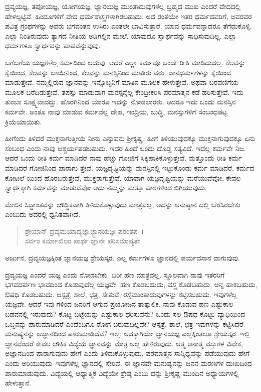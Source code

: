 ದ್ರವ್ಯಯಜ್ಞ, ತಪೋಯಜ್ಞ, ಯೋಗಯಜ್ಞ, ಜ್ಞಾನಯಜ್ಞ ಮುಂತಾದುವುಗಳೆಲ್ಲ ಬ್ರಹ್ಮದ ಮುಖ ಎಂದರೆ ವೇದದಲ್ಲಿ ಹೇಳಲ್ಪಟ್ಟಿವೆ. ಹಿಂದೂಗಳಿಗೆ ವೇದ ಧರ್ಮಶಾಸ್ತ್ರಗಳಾಗಿರಬಹುದು. ಅದ ರಂತೆಯೇ ಇತರ ಧರ್ಮದವರಿಗೆ, ಅವರವರ ಪವಿತ್ರ ಗ್ರಂಥಗಳನ್ನು ಅವರು ಭಗವಂತನ ಉಸಿರು ಎಂತಲೇ ಭಾವಿಸುತ್ತಾರೆ. ಯಾವ ಧರ್ಮವನ್ನಾದರೂ ತೆಗೆದುಕೊಳ್ಳಿ. ಎಲ್ಲಾ ನಿಂತಿರುವುದು ತ್ಯಾಗದ ನೀತಿಯ ಅಡಿಗಲ್ಲಿನ ಮೇಲೆ. ಯಾವುದೂ ಸ್ವಾರ್ಥವನ್ನು ಸಾಧಿಸುವುದಿಲ್ಲ. ಎಲ್ಲಾ ಧರ್ಮಗಳೂ ಸ್ವಾರ್ಥವನ್ನು ಪಾಪವೆನ್ನುವುವು.

ಬಗೆಬಗೆಯ ಯಜ್ಞಗಳೆಲ್ಲ ಕರ್ಮದಿಂದ ಆದುವು. ಆದರೆ ಎಲ್ಲಾ ಕರ್ಮವೂ ಒಂದೇ ರೀತಿ ಮಾಡಿದುದಲ್ಲ. ಕೆಲವನ್ನು ಕೈಯಿಂದ, ಕೆಲವನ್ನು ಬಾಯಿನಿಂದ, ಕೆಲವನ್ನು ಮನಸ್ಸಿನಿಂದ ಮಾಡಿರು ವರು. ದಾನಧರ್ಮಗಳನ್ನು ಕೈಯಿಂದ ಮಾಡುತ್ತೇವೆ. ನಮ್ಮಲ್ಲಿರುವ ಜ್ಞಾನವನ್ನು ಇನ್ನೊಬ್ಬನಿಗೆ ಮಾತಿನ ಮೂಲಕ ಹೇಳುತ್ತೇವೆ. ಅಥವಾ ಬರವಣಿಗೆಯ ಮೂಲಕ ಬರೆದಿಡುತ್ತೇವೆ. ತಪಸ್ಸು ಮಾಡುವಾಗ ಮನಸ್ಸನ್ನೆಲ್ಲ ಕೇಂದ್ರೀಕರಿಸಿ ಪರಮಾತ್ಮನ ಕಡೆ ಹರಿಸುತ್ತೇವೆ. ಇದು ತುಂಬಾ ಸೂಕ್ಷ್ಮವಾದದ್ದು. ಹೊರಗಿನಿಂದ ಯಾರೂ ಇದನ್ನು ನೋಡಲಾರರು. ಆದರೂ ಇದು ಒಂದು ಮನಸ್ಸಿನ ಕರ್ಮವೇ. ಅಂತೂ ನಾವು ಮಾಡುವ ಕರ್ಮವೆಲ್ಲ ದೇಹ, ಇಂದ್ರಿಯ, ಬುದ್ಧಿ, ಮನಸ್ಸುಗಳಿಗೆ ಸಂಬಂಧಪಟ್ಟ ಕ್ರಿಯೆಯಾಯಿತು.

ಹೀಗೆಂದು ತಿಳಿದರೆ ಮುಕ್ತನಾಗುತ್ತೀಯೆ ನೀನು ಎನ್ನುವನು ಶ‍್ರೀಕೃಷ್ಣ. ಹೀಗೆ ತಿಳಿಯುವುದಕ್ಕೂ ಮುಕ್ತನಾಗುವುದಕ್ಕೂ ಏನು ಸಂಬಂಧ ಎಂದು ನಾವು ಆಶ್ಚರ್ಯಪಡಬಹುದು. ಇದರ ಹಿಂದೆ ಒಂದು ದೊಡ್ಡ ಸತ್ಯವಿದೆ. ಇದೆಲ್ಲ ಕರ್ಮವೇ ನಿಜ. ಆದರೆ ಒಂದು ರೀತಿ ಕರ್ಮ ಮಾಡಿದರೆ ನಾವು ಹೆಚ್ಚು ಗೋಜಿಗೆ ಸಿಕ್ಕಿಹಾಕಿಕೊಳ್ಳುತ್ತೇವೆ. ಮತ್ತೊಂದು ರೀತಿ ಕರ್ಮ ಮಾಡಿದರೆ ಗೋಜಿನಿಂದ ಪಾರಾಗು ತ್ತೇವೆ. ಯಜ್ಞದೃಷ್ಟಿಯನ್ನು ಮನಸ್ಸಿನಲ್ಲಿ ಇಟ್ಟುಕೊಂಡು ಕರ್ಮ ಮಾಡಿದರೆ, ಕರ್ಮದ ಕೋಟಲೆ ಯಿಂದ ಹೊರಬರುತ್ತೇವೆ, ಮುಕ್ತರಾಗುತ್ತೇವೆ. ಯಾವಾಗ ಯಜ್ಞದೃಷ್ಟಿಯನ್ನು ಮರೆಯುವೆವೋ, ಕೇವಲ ಸ್ವಾರ್ಥಕ್ಕಾಗಿ ಕರ್ಮವನ್ನು ಮಾಡುವೆವೋ ಅದು ನಮ್ಮನ್ನು ಮತ್ತೂ ಪಾಶಗಳಿಂದ ಬಿಗಿಯುವುದು.

ಮೇಲಿನ ಸಿದ್ಧಾಂತವನ್ನು ಬೌದ್ಧಿಕವಾಗಿ ತಿಳಿದುಕೊಳ್ಳುವುದು ಮಾತ್ರವಲ್ಲ, ಅದನ್ನು ಅನುಷ್ಠಾನ ದಲ್ಲಿ ಬೆರೆಸಿರಬೇಕು ಎಂಬುದು ಅದರಲ್ಲಿ ಧ್ವನಿತವಾಗಿದೆ.

\begin{verse}
ಶ್ರೇಯಾನ್ ದ್ರವ್ಯಮಯಾದ್ಯಜ್ಞಾಜ್ಜ್ಞಾನಯಜ್ಞಃ ಪರಂತಪ~।\\ಸರ್ವಂ ಕರ್ಮಾಖಿಲಂ ಪಾರ್ಥ ಜ್ಞಾನೇ ಪರಿಸಮಾಪ್ಯತೇ 
\end{verse}

{\small ಅರ್ಜುನ, ದ್ರವ್ಯಯಜ್ಞಕ್ಕಿಂತ ಜ್ಞಾನಯಜ್ಞ ಶ್ರೇಯಸ್ಕರ. ಎಲ್ಲ ಕರ್ಮಗಳೂ ಜ್ಞಾನದಲ್ಲಿ ಪರ್ಯವಸಾನ ವಾಗುವುವು.}

ದ್ರವ್ಯಯಜ್ಞ ಎಂದರೆ  ಯಜ್ಞ ಎಂದು ನೋಡಬೇಕು. ಬರೀ ಹಣ ಮಾತ್ರವಲ್ಲ. ಸ್ಥೂಲವಾಗಿ ನಾವು ಇತರರಿಗೆ ಭಗವದರ್ಪಣ ಭಾವದಿಂದ ಕೊಡುವುದೆಲ್ಲ ಯಜ್ಞವೇ. ಹಣ ಕೊಡಬಹುದು, ವಸ್ತ್ರ ಕೊಡಬಹುದು, ಅನ್ನ ಹಾಕಬಹುದು, ಔಷಧಿ ಕೊಡಬಹುದು. ಆಸ್ಪತ್ರೆ, ಶಾಲೆ, ಛತ್ರ, ಸೇತುವೆ, ರಸ್ತೆಮುಂತಾದುವುಗಳನ್ನು ಕಟ್ಟಿಸಬಹುದು. ಇವುಗಳೆಲ್ಲ ಯಜ್ಞವೇ. ಆದರೆ ಇವು ಗಳಿಂದ ಜನರಿಗೆ ಆಗುವ ಪ್ರಯೋಜನ ತಾತ್ಕಾಲಿಕ. ನಾವು ಕೊಡುವ ಹಣ ಎಷ್ಟುಕಾಲ ಬಡವನಲ್ಲಿ ಇರುವುದು? ಕೊಟ್ಟ ಬಟ್ಟೆಯನ್ನು ಎಷ್ಟುಕಾಲ ಧರಿಸುವನು? ಒಂದು ಸಲ ಔಷಧ ಕೊಟ್ಟು ವ್ಯಾಧಿಯಿಂದ ಒಬ್ಬನನ್ನು ಪಾರುಮಾಡಿದರೆ ಎಂದೆಂದಿಗೂ ರೋಗ ಬರುವುದಿಲ್ಲವೇ? ಆಸ್ಪತ್ರೆ, ಶಾಲೆ, ಛತ್ರ ಇವುಗಳನ್ನು ಕಟ್ಟಿಸಿದರೆ ಮನುಷ್ಯನನ್ನು ಅಜ್ಞಾನದಿಂದ ಪಾರುಮಾಡಿದೆವೆ? ಇಲ್ಲ. ಅದಕ್ಕಾಗಿಯೇ ಜ್ಞಾನಯಜ್ಞ ಎಲ್ಲಕ್ಕಿಂತಲೂ ಶ್ರೇಯಸ್ಕರ. ಇಲ್ಲಿ ಜ್ಞಾನವೆಂದರೆ ಕೇವಲ ಲೌಕಿಕ ವಿದ್ಯೆಯ ಜ್ಞಾನವನ್ನು ಮಾತ್ರ ಅಲ್ಲ ಹೇಳಿರುವುದು. ಆತ್ಮ ಅನಾತ್ಮ ವಸ್ತುಗಳ ವಿವೇಕ, ಅಜ್ಞಾನದಿಂದ ಪಾರಾಗುವುದು ಹೇಗೆ ಎಂದು ತಿಳಿದುಕೊಳ್ಳುವುದು, ಪರಮಾತ್ಮನ ಸಾನ್ನಿಧ್ಯವನ್ನು ಪಡೆಯುವುದು ಹೇಗೆ ಎಂದು ಅರಿಯುವುದು–ಇವುಗಳೆಲ್ಲ ಜ್ಞಾನದಲ್ಲಿ ಸೇರಿವೆ. ಈ ಜ್ಞಾನವೇ ಮನುಷ್ಯನನ್ನು ಜನನ ಮರಣಗಳ ದುಃಖದಿಂದ ಪಾರುಮಾಡುವುದು. ವಿದ್ಯೆಯಲ್ಲಿ ಆಧ್ಯಾತ್ಮಿಕ ವಿದ್ಯೆಯೇ ಶ್ರೇಷ್ಠ ಎಂಬು ದನ್ನು ಶ‍್ರೀಕೃಷ್ಣ ಮುಂದಿನ ಅಧ್ಯಾಯಗಳಲ್ಲಿ ಹೇಳುತ್ತಾನೆ.

